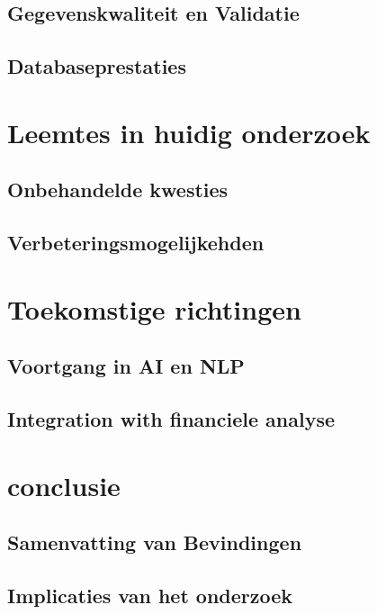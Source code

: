 \subsection{Gegevenskwaliteit en Validatie}
\subsection{Databaseprestaties}
\section{Leemtes in huidig onderzoek}
\subsection{Onbehandelde kwesties}
\subsection{Verbeteringsmogelijkehden}

\section{Toekomstige richtingen}
\subsection{Voortgang in AI en NLP}
\subsection{Integration with financiele analyse}
\section{conclusie}
\subsection{Samenvatting van Bevindingen}
\subsection{Implicaties van het onderzoek}